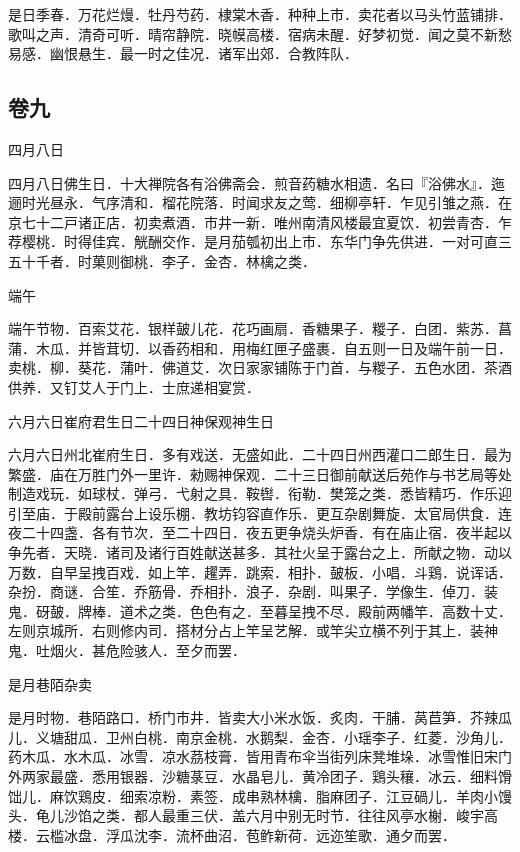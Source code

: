 \documentclass[]{article}
\begin{document}
是日季春．万花烂熳．牡丹芍药．棣棠木香．种种上市．卖花者以马头竹蓝铺排．歌叫之声．清奇可听．晴帘静院．晓幙高楼．宿病未醒．好梦初觉．闻之莫不新愁易感．幽恨悬生．最一时之佳况．诸军出郊．合教阵队．

\hypertarget{header-n152}{%
\subsection{卷九}\label{header-n152}}

四月八日

四月八日佛生日．十大禅院各有浴佛斋会．煎音药糖水相遗．名曰『浴佛水』．迤逦时光昼永．气序清和．榴花院落．时闻求友之莺．细柳亭轩．乍见引雏之燕．在京七十二戸诸正店．初卖煮酒．市井一新．唯州南清风楼最宜夏饮．初尝青杏．乍荐樱桃．时得佳宾．觥酬交作．是月茄瓠初出上市．东华门争先供进．一对可直三五十千者．时菓则御桃．李子．金杏．林檎之类．

端午

端午节物．百索艾花．银样皷儿花．花巧画扇．香糖果子．糉子．白团．紫苏．菖蒲．木瓜．并皆茸切．以香药相和．用梅红匣子盛裹．自五则一日及端午前一日．卖桃．柳．葵花．蒲叶．佛道艾．次日家家铺陈于门首．与糉子．五色水团．茶酒供养．又钉艾人于门上．士庶递相宴赏．

六月六日崔府君生日二十四日神保观神生日

六月六日州北崔府生日．多有戏送．无盛如此．二十四日州西灌口二郎生日．最为繁盛．庙在万胜门外一里许．勑赐神保观．二十三日御前献送后苑作与书艺局等处制造戏玩．如球杖．弹弓．弋射之具．鞍辔．衔勒．樊笼之类．悉皆精巧．作乐迎引至庙．于殿前露台上设乐棚．教坊钧容直作乐．更互杂剧舞旋．太官局供食．连夜二十四盏．各有节次．至二十四日．夜五更争烧头炉香．有在庙止宿．夜半起以争先者．天晓．诸司及诸行百姓献送甚多．其社火呈于露台之上．所献之物．动以万数．自早呈拽百戏．如上竿．趯弄．跳索．相扑．皷板．小唱．斗鶏．说诨话．杂扮．商谜．合笙．乔筋骨．乔相扑．浪子．杂剧．叫果子．学像生．倬刀．装鬼．砑皷．牌棒．道术之类．色色有之．至暮呈拽不尽．殿前两幡竿．高数十丈．左则京城所．右则修内司．搭材分占上竿呈艺解．或竿尖立横不列于其上．装神鬼．吐烟火．甚危险骇人．至夕而罢．

是月巷陌杂卖

是月时物．巷陌路口．桥门市井．皆卖大小米水饭．炙肉．干脯．莴苣笋．芥辣瓜儿．义塘甜瓜．卫州白桃．南京金桃．水鹅梨．金杏．小瑶李子．红菱．沙角儿．药木瓜．水木瓜．冰雪．凉水茘枝膏．皆用青布伞当街列床凳堆垛．冰雪惟旧宋门外两家最盛．悉用银器．沙糖菉豆．水晶皂儿．黄冷团子．鶏头穰．冰云．细料馉饳儿．麻饮鶏皮．细索凉粉．素签．成串熟林檎．脂麻团子．江豆碢儿．羊肉小馒头．龟儿沙馅之类．都人最重三伏．盖六月中别无时节．往往风亭水榭．峻宇高楼．云槛冰盘．浮瓜沈李．流杯曲沼．苞鲊新荷．远迩笙歌．通夕而罢．
\end{document}
